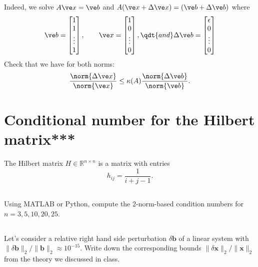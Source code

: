 \documentclass[11pt,letterpaper]{report}
\begin{document}
\subsection{}
Indeed, we solve $A\ve x = \ve b$ and $A(\ve x+\Delta \ve x) = (\ve b+\Delta \ve b)$ where
\begin{align*}
    \ve b = \begin{bmatrix}
    1\\1\\\vdots\\1
    \end{bmatrix},\qquad \ve x = \begin{bmatrix}
    1\\0\\\vdots\\0
    \end{bmatrix},\qdt{and} \Delta\ve b = \begin{bmatrix}
    \epsilon\\0\\\vdots\\0
    \end{bmatrix}
\end{align*}
Check that we have for both norms:
\begin{align*}
    \frac{\norm{\Delta\ve x}}{\norm{\ve x}} \leq \kappa(A)\frac{\norm{\Delta\ve b}}{\norm{\ve b}}.
\end{align*}

\section{Conditional number for the Hilbert matrix***}  
The Hilbert matrix $H\in \mathbb R^{n\times n}$ is a matrix with
  entries
  $$
  h_{ij} = \frac{1}{i+j-1}.
  $$ 
\subsection{}
Using MATLAB or Python, compute the 2-norm-based condition
  numbers for $n=3,5,10,20,25$.  
  
\subsection{}
  Let's consider a relative right hand
  side perturbation $\delta\boldsymbol b$ of a linear system with
  $\|\delta\boldsymbol b\|_2/\|\boldsymbol b\|_2\approx
  10^{-15}$. Write down the corresponding bounds $\|\delta\boldsymbol
  x\|_2/\|\boldsymbol x\|_2$ from the theory we discussed in class.
\end{document}
